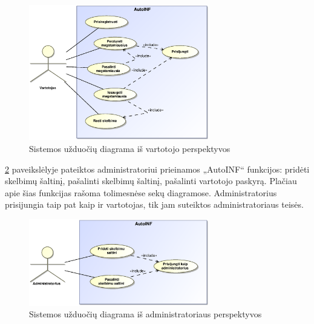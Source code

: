 \documentclass[12pt]{article}
\begin{document}
	\begin{figure}[h]
		\begin{center}
			\includegraphics[width=0.7\textwidth]{TikslaiVartotojas.eps}
			\caption{Sistemos užduočių diagrama iš vartotojo perspektyvos\label{UseCaseUser}}
		\end{center}
	\end{figure}
	
	\pagebreak	
	
	\ref{UseCaseAdmin} paveikslėlyje pateiktos administratoriui prieinamos „AutoINF“ funkcijos: pridėti skelbimų šaltinį, pašalinti skelbimų šaltinį, pašalinti vartotojo paskyrą. Plačiau apie šias funkcijas rašoma tolimesnėse sekų diagramose. Administratorius prisijungia taip pat kaip ir vartotojas, tik jam suteiktos administratoriaus teisės.	
	
	\begin{figure}[h]
		\begin{center}
			\includegraphics[width=0.7\textwidth]{TikslaiAdministratorius.eps}
			\caption{Sistemos užduočių diagrama iš administratoriaus perspektyvos\label{UseCaseAdmin}}
		\end{center}
	\end{figure}	
	
\end{document}

